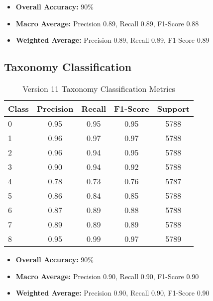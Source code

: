 \begin{itemize}
    \item \textbf{Overall Accuracy:} 90\%
    \item \textbf{Macro Average:} Precision 0.89, Recall 0.89, F1-Score 0.88
    \item \textbf{Weighted Average:} Precision 0.89, Recall 0.89, F1-Score 0.89
\end{itemize}

\subsection*{Taxonomy Classification}

\begin{table}[h!]
    \centering
    \caption{Version 11 Taxonomy Classification Metrics}
    \label{tab:v11_taxonomy_metrics}
    \begin{tabular}{|l|c|c|c|c|}
    \hline
    \textbf{Class} & \textbf{Precision} & \textbf{Recall} & \textbf{F1-Score} & \textbf{Support} \\
    \hline
    0 & 0.95 & 0.95 & 0.95 & 5788 \\
    \hline
    1 & 0.96 & 0.97 & 0.97 & 5788 \\
    \hline
    2 & 0.96 & 0.94 & 0.95 & 5788 \\
    \hline
    3 & 0.90 & 0.94 & 0.92 & 5788 \\
    \hline
    4 & 0.78 & 0.73 & 0.76 & 5787 \\
    \hline
    5 & 0.86 & 0.84 & 0.85 & 5788 \\
    \hline
    6 & 0.87 & 0.89 & 0.88 & 5788 \\
    \hline
    7 & 0.89 & 0.89 & 0.89 & 5788 \\
    \hline
    8 & 0.95 & 0.99 & 0.97 & 5789 \\
    \hline
    \end{tabular}
\end{table}

\begin{itemize}
    \item \textbf{Overall Accuracy:} 90\%
    \item \textbf{Macro Average:} Precision 0.90, Recall 0.90, F1-Score 0.90
    \item \textbf{Weighted Average:} Precision 0.90, Recall 0.90, F1-Score 0.90
\end{itemize}